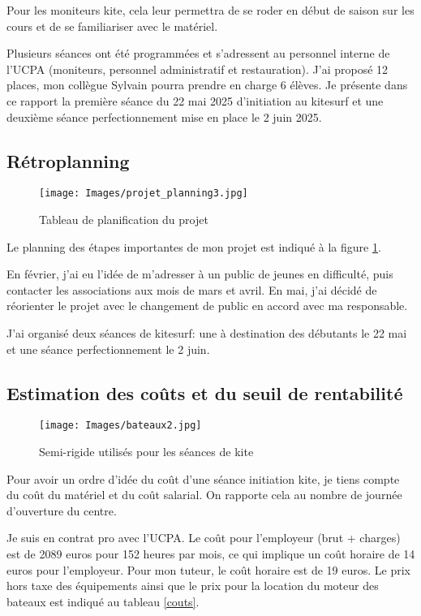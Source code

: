 \documentclass[11pt,a4paper]{report}
\begin{document}
Pour les moniteurs kite, cela leur permettra de se roder en début de
saison sur les cours et de se familiariser avec le matériel.

Plusieurs séances ont été programmées et s'adressent au personnel 
interne de l'UCPA (moniteurs, personnel administratif et
restauration). J'ai  proposé 12 places, mon collègue Sylvain
pourra prendre en charge 6 élèves.
Je présente dans ce rapport la première séance du 22 mai 2025 d'initiation 
au kitesurf et une deuxième séance perfectionnement mise en place
le 2 juin 2025.

\subsection{Rétroplanning}
\begin{figure}[h]
\centering
\texttt{[image: Images/projet\_planning3.jpg]} 
\caption{Tableau de planification du projet \label{gantt}}
\end{figure}
Le planning des étapes importantes de mon projet est indiqué
à la figure \ref{gantt}. 

En février, j'ai eu l'idée de m'adresser à un public
de jeunes en difficulté, puis contacter les associations aux mois de mars et avril. 
En mai, j'ai décidé  de  réorienter 
le projet avec le changement de public en accord avec
ma responsable. 

J'ai organisé deux séances de kitesurf: une à destination des
débutants le 22 mai et une séance perfectionnement le 2 juin. 


\subsection{Estimation des co\^uts et du seuil de rentabilité}

\begin{figure}
\centering
\texttt{[image: Images/bateaux2.jpg]} 
\caption{Semi-rigide utilisés pour les séances de kite\label{bateaux}}
\end{figure}
Pour avoir un ordre d'idée du coût d'une séance initiation kite, je
tiens compte du co\^ut du matériel et du co\^ut salarial. On rapporte 
cela au nombre de journée d'ouverture du centre.

Je suis en contrat pro avec l'UCPA. Le coût pour
l'employeur (brut + charges) est de 2089 euros pour 152 heures par mois, 
ce qui implique un coût horaire de 14 euros pour l'employeur.
Pour mon tuteur, le coût horaire est de 19 euros. Le prix hors taxe
des équipements ainsi que le prix pour la location du moteur des
bateaux est indiqué au tableau \ref{couts}.
\end{document}
